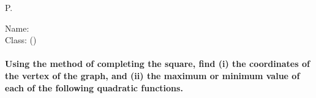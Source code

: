 \documentclass[11pt,a4paper, addpoints] {exam}
\begin{document}
\setlength\dottedlinefillheight{0.79cm}
\footer{}
       {P.\thepage}{}
\headrule 
\footrule

\printanswers %

		{}
		{\textsf{Name:} \underline{\hspace{2.85cm}}\\
                  \hfill \textsf{Class:} \underline{\hspace{1.8cm}}(\qquad)}
\pgfmathsetseed{\year} %
\paragraph*{Using the method of completing the square, find (i) the coordinates of the vertex of the graph, and (ii) the maximum or minimum value of each of the following quadratic functions.}
\end{document}
